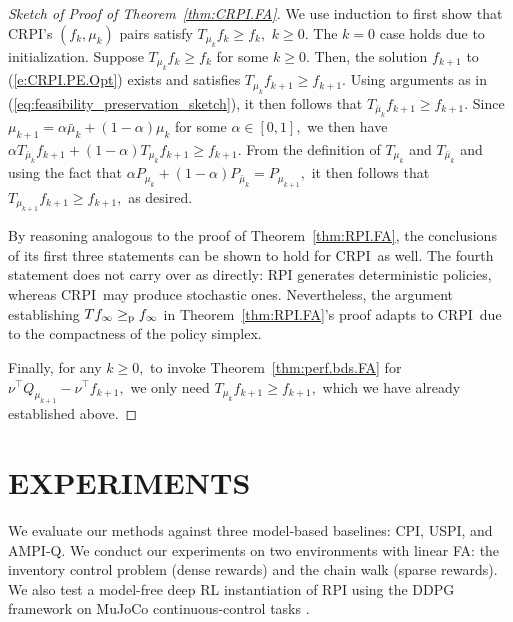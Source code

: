 \documentclass[twoside]{article}
\theoremstyle{plain}
\theoremstyle{definition}
\theoremstyle{remark}
\newcommand{\tr}{\top}
\newcommand{\mub}{\bar{\mu}}
\newcommand{\CRPI}{CRPI}
\newcommand{\gep}{\geq_{\textnormal{p}}}
\renewcommand{\eqref}[1]{(\ref{#1})}
\begin{document}
%
\begin{proof}[Sketch of Proof of Theorem~\ref{thm:CRPI.FA}]
%
We use induction to first show that \CRPI's $(f_k, \mu_k)$ pairs satisfy $T_{\mu_k} f_k \geq f_k,$ $k \geq 0.$ The $k = 0$ case holds due to initialization. Suppose $T_{\mu_k} f_k \geq f_k$ for some $k \geq 0.$ Then, the solution $f_{k + 1}$ to \eqref{e:CRPI.PE.Opt} exists and  satisfies $T_{\mu_k} f_{k + 1} \geq f_{k + 1}.$ Using arguments as in \eqref{eq:feasibility_preservation_sketch}, it then follows that $T_{\mub_k} f_{k + 1} \geq f_{k + 1}.$ Since $\mu_{k + 1} = \alpha \mub_k + (1 - \alpha)\mu_k$ for some $\alpha \in [0, 1],$ we then have $\alpha T_{\bar{\mu}_k}f_{k+1} + (1-\alpha)T_{\mu_k}f_{k+1} \geq f_{k + 1}.$ From the definition of $T_{\mu_k}$ and $T_{\mub_k}$ and using the fact that $\alpha P_{\mu_k} + (1 - \alpha) P_{\mub_k} = P_{\mu_{k + 1}},$ it then follows that $T_{\mu_{k + 1}}f_{k + 1} \geq f_{k + 1},$ as desired. 

By reasoning analogous to the proof of Theorem~\ref{thm:RPI.FA}, the conclusions of its first three statements can be shown to hold for \CRPI\ as well. The fourth statement does not carry over as directly: RPI generates deterministic policies, whereas \CRPI\ may produce stochastic ones. Nevertheless, the argument establishing $Tf_\infty \gep f_\infty$ in Theorem~\ref{thm:RPI.FA}'s proof adapts to \CRPI\ due to the compactness of the policy simplex. 

Finally, for any $k \geq 0,$ to invoke Theorem~\ref{thm:perf.bds.FA} for $\nu^\tr Q_{\mu_{k + 1}} - \nu^\tr f_{k + 1},$ we only need $T_{\mu_k} f_{k + 1} \geq f_{k + 1},$ which we have already established above. 
%
\end{proof}






\section{EXPERIMENTS}

We evaluate our methods against three model-based baselines: CPI, USPI, and AMPI-Q. We conduct our experiments  on two environments with linear FA: the inventory control problem \citep{bertsekas2012dynamic} (dense rewards) and the chain walk \citep{lagoudakis2003least} (sparse rewards). 
We also test a model-free deep RL instantiation of RPI using the DDPG framework \citep{ddpg} on MuJoCo continuous-control tasks \citep{brockman2016openai, todorov2012mujoco}.
\end{document}
